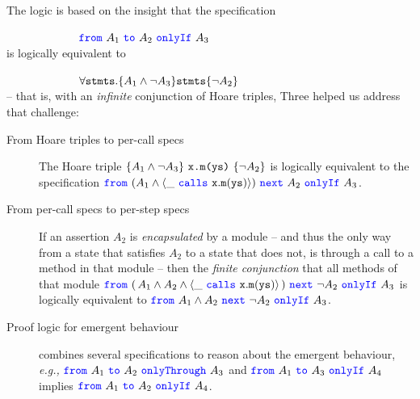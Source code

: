 {{The \Nec logic is based on the {insight} that the specification\\
\strut $\hspace{1in}$  ${\color{blue}\texttt{from}}\ A_1\ {\color{blue}\texttt{to}}\ A_2\ {\color{blue}\texttt{onlyIf}}\ A_3$
\\
 is  logically equivalent {to} \\
 \strut $\hspace{1in}$  $\forall {\texttt{stmts}}. \{ A_1 \wedge \neg A_3\} {\texttt{stmts}} \{ \neg A_2 \}$\\
 -- that is,
 with an \emph{infinite} conjunction  of Hoare triples, 
 Three  helped us address   that challenge: 

 \begin{description}
 \item
 [From Hoare triples to per-call specs] 
  The Hoare triple 
$ \{ A_1 \wedge \neg A_3 \} \ {\texttt{x.m(ys)}}\  \{ \neg A_2 \}$ is logically equivalent 
 {to} the specification
$ {\color{blue}\texttt{from}}\ (A_1 \wedge  \langle \_\ {\color{blue}\texttt{calls}}\ {\texttt{x}}.{\texttt{m}}({\texttt{ys}}) \rangle )\ {\color{blue}\texttt{next}}\ A_2\ {\color{blue}\texttt{onlyIf}}\ A_3$.  
 
 \item 
 [From per-call specs to per-step specs] %
 If an assertion $A_2$  is \emph{encapsulated} by a module -- and thus the only way from a 
 state that satisfies $A_2$ to a state that does not, is through a call to a method in that module -- then
{the
\emph{finite conjunction}
that all methods of that module {$ {\color{blue}\texttt{from}}\ (\, A_1 \wedge A_2 \wedge {\langle \_\ {\color{blue}\texttt{calls}}\ {\texttt{x}}.{\texttt{m}}({\texttt{ys}}) \rangle}\, )\ {\color{blue}\texttt{next}}\ \neg  A_2\ {\color{blue}\texttt{onlyIf}}\ A_3$}
  is logically equivalent 
 {to}
{$ {\color{blue}\texttt{from}}\ A_1 \wedge A_2\ {\color{blue}\texttt{next}}\ \neg A_2\ {\color{blue}\texttt{onlyIf}}\ A_3$. }}
 
  \item [Proof logic  for emergent behaviour] %
  combines several specifications to reason about the
  emergent behaviour, \emph{e.g.,} 
   $ {\color{blue}\texttt{from}}\ A_1\ {\color{blue}\texttt{to}}\ A_2\ {\color{blue}\texttt{onlyThrough}}\ A_3$  and $ {\color{blue}\texttt{from}}\ A_1\ {\color{blue}\texttt{to}}\ A_3\ {\color{blue}\texttt{onlyIf}}\ A_4$ implies 
   $ {\color{blue}\texttt{from}}\ A_1\ {\color{blue}\texttt{to}}\ A_2\ {\color{blue}\texttt{onlyIf}}\ A_4$.
 \end{description}




}}

